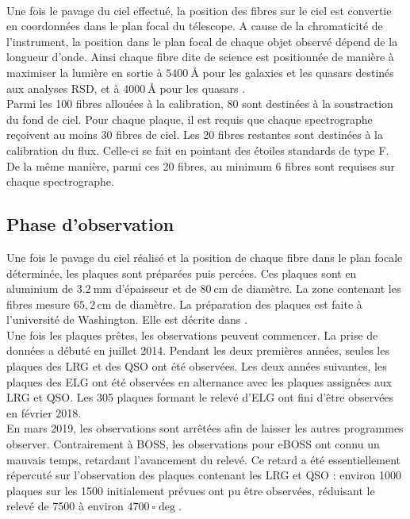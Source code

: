 \paragraph{} Une fois le pavage du ciel effectué, la position des fibres sur le ciel est convertie en coordonnées dans le plan focal du télescope. A cause de la chromaticité de l'instrument, la position dans le plan focal de chaque objet observé dépend de la longueur d'onde. Ainsi chaque fibre dite de science est positionnée de manière à maximiser la lumière en sortie à $\SI{5400}{\angstrom}$ pour les galaxies et les quasars destinés aux analyses RSD, et à $\SI{4000}{\angstrom}$ pour les quasars \lya{}. \\
Parmi les \num{100} fibres allouées à la calibration, \num{80} sont destinées à la soustraction du fond de ciel. Pour chaque plaque, il est requis que chaque spectrographe reçoivent au moins \num{30} fibres de ciel. Les \num{20} fibres restantes sont destinées à la calibration du flux. Celle-ci se fait en pointant des étoiles standards de type F. De la même manière, parmi ces \num{20} fibres, au minimum \num{6} fibres sont requises sur chaque spectrographe.


\subsection{Phase d'observation}

Une fois le pavage du ciel réalisé et la position de chaque fibre dans le plan focale déterminée, les plaques sont préparées puis percées. Ces plaques sont en aluminium de $\SI{3,2}{\milli\meter}$ d'épaisseur et de $\SI{80}{\centi\meter}$ de diamètre. La zone contenant les fibres mesure $65,2\,\mathrm{cm}$ de diamètre. La préparation des plaques est faite à l'université de Washington. Elle est décrite dans \textcite{Blanton2017}.\\
Une fois les plaques prêtes, les observations peuvent commencer. La prise de données a débuté en juillet 2014. Pendant les deux premières années, seules les plaques des LRG et des QSO ont été observées. Les deux années suivantes, les plaques des ELG ont été observées en alternance avec les plaques assignées aux LRG et QSO. Les \num{305} plaques formant le relevé d'ELG ont fini d'être observées en février 2018. \\
En mars 2019, les observations sont arrêtées afin de laisser les autres programmes observer. Contrairement à BOSS, les observations pour eBOSS ont connu un mauvais temps, retardant l'avancement du relevé. Ce retard a été essentiellement répercuté sur l'observation des plaques contenant les LRG et QSO : environ \num{1000} plaques sur les \num{1500} initialement prévues ont pu être observées, réduisant le relevé de \num{7500} à environ $\SI{4700}{\square\deg}$.


